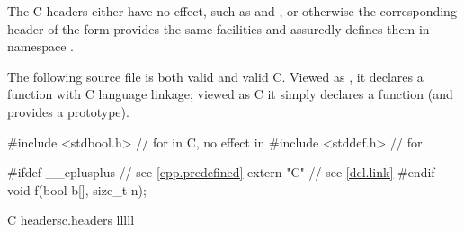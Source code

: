 \begin{note}
The C headers either have no effect,
such as  and , or
otherwise the corresponding header of the form 
provides the same facilities and
assuredly defines them in namespace .
\end{note}
\begin{example}
The following source file is both valid \Cpp{} and valid C.
Viewed as \Cpp{}, it declares a function with C language linkage;
viewed as C it simply declares a function (and provides a prototype).
\begin{codeblock}
#include <stdbool.h>    // for  in C, no effect in \Cpp{}
#include <stddef.h>     // for 

#ifdef __cplusplus      // see \ref{cpp.predefined}
extern "C"              // see \ref{dcl.link}
#endif
void f(bool b[], size_t n);
\end{codeblock}
\end{example}

\begin{multicolfloattable}{C headers}{c.headers}
{lllll}
 \\
 \\
 \\
 \\
 \\
 \\
\columnbreak
{} \\
 \\
 \\
 \\
 \\
 \\
\columnbreak
{} \\
 \\
 \\
 \\
 \\
 \\
\columnbreak
{} \\
 \\
 \\
 \\
 \\
 \\
\columnbreak
{} \\
 \\
 \\
 \\
 \\
\end{multicolfloattable}


